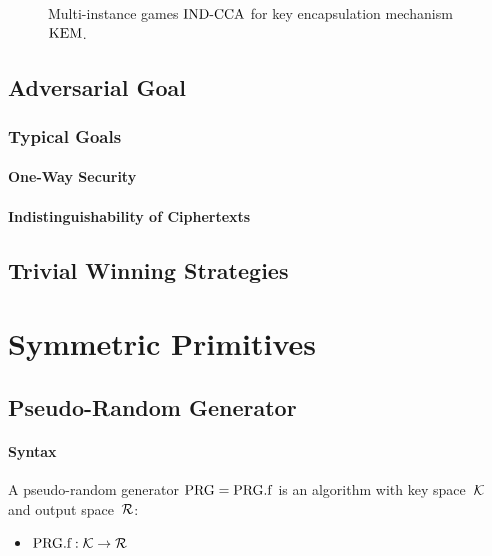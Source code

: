 \documentclass[a4paper,orivec]{llncs}
\begin{document}
\begin{figure}[!ht]
    \centering
    \nicoresetlinenr%
    \fbox{%
        \scalebox{\codescalefactor}{%
        }%
    }
    \caption{%
        Multi-instance games ${\mathrm{IND}\text{-}\mathrm{CCA}}$ for key encapsulation mechanism~$\mathrm{KEM}$.
    }
    \label{fig:kem:ind:mi:corrupt}
\end{figure}

\subsection{Adversarial Goal}

\subsubsection{Typical Goals}

\paragraph{One-Way Security}

\paragraph{Indistinguishability of Ciphertexts}

\subsection{Trivial Winning Strategies}


\section{Symmetric Primitives}


\subsection{Pseudo-Random Generator}


\paragraph{Syntax}
A pseudo-random generator $\mathrm{PRG}=\mathrm{PRG}.\mathrm{f}$ is an algorithm with key space~$\mathcal{K}$ and output space~$\mathcal{R}$:

\begin{itemize}
    \item $\mathrm{PRG}.\mathrm{f}: \mathcal{K} \to \mathcal{R}$
\end{itemize}
\end{document}
